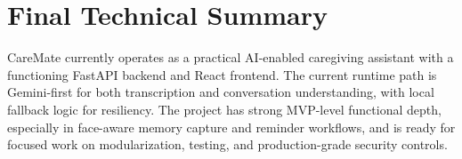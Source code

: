 \documentclass[12pt,a4paper]{article}
\begin{document}
\section{Final Technical Summary}
CareMate currently operates as a practical AI-enabled caregiving assistant with a functioning FastAPI backend and React frontend. The current runtime path is Gemini-first for both transcription and conversation understanding, with local fallback logic for resiliency. The project has strong MVP-level functional depth, especially in face-aware memory capture and reminder workflows, and is ready for focused work on modularization, testing, and production-grade security controls.
\end{document}

